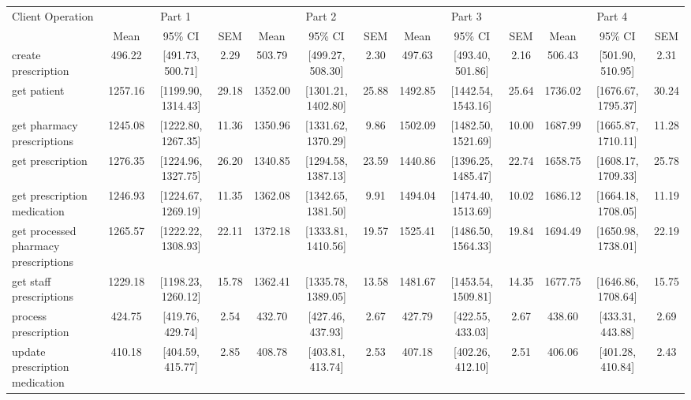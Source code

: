 \begin{tabular}{l|ccc|ccc|ccc|ccc}
\hline
Client Operation & \multicolumn{3}{c}{Part 1} & \multicolumn{3}{c}{Part 2} & \multicolumn{3}{c}{Part 3} & \multicolumn{3}{c}{Part 4} \\
  & Mean & 95\% CI & SEM & Mean & 95\% CI & SEM & Mean & 95\% CI & SEM & Mean & 95\% CI & SEM \\
\hline
 create prescription & 496.22 & [491.73, 500.71] & 2.29 & 503.79 & [499.27, 508.30] & 2.30 & 497.63 & [493.40, 501.86] & 2.16 & 506.43 & [501.90, 510.95] & 2.31 \\
 get patient & 1257.16 & [1199.90, 1314.43] & 29.18 & 1352.00 & [1301.21, 1402.80] & 25.88 & 1492.85 & [1442.54, 1543.16] & 25.64 & 1736.02 & [1676.67, 1795.37] & 30.24 \\
 get pharmacy prescriptions & 1245.08 & [1222.80, 1267.35] & 11.36 & 1350.96 & [1331.62, 1370.29] & 9.86 & 1502.09 & [1482.50, 1521.69] & 10.00 & 1687.99 & [1665.87, 1710.11] & 11.28 \\
 get prescription & 1276.35 & [1224.96, 1327.75] & 26.20 & 1340.85 & [1294.58, 1387.13] & 23.59 & 1440.86 & [1396.25, 1485.47] & 22.74 & 1658.75 & [1608.17, 1709.33] & 25.78 \\
 get prescription medication & 1246.93 & [1224.67, 1269.19] & 11.35 & 1362.08 & [1342.65, 1381.50] & 9.91 & 1494.04 & [1474.40, 1513.69] & 10.02 & 1686.12 & [1664.18, 1708.05] & 11.19 \\
 get processed pharmacy prescriptions & 1265.57 & [1222.22, 1308.93] & 22.11 & 1372.18 & [1333.81, 1410.56] & 19.57 & 1525.41 & [1486.50, 1564.33] & 19.84 & 1694.49 & [1650.98, 1738.01] & 22.19 \\
 get staff prescriptions & 1229.18 & [1198.23, 1260.12] & 15.78 & 1362.41 & [1335.78, 1389.05] & 13.58 & 1481.67 & [1453.54, 1509.81] & 14.35 & 1677.75 & [1646.86, 1708.64] & 15.75 \\
 process prescription & 424.75 & [419.76, 429.74] & 2.54 & 432.70 & [427.46, 437.93] & 2.67 & 427.79 & [422.55, 433.03] & 2.67 & 438.60 & [433.31, 443.88] & 2.69 \\
 update prescription medication & 410.18 & [404.59, 415.77] & 2.85 & 408.78 & [403.81, 413.74] & 2.53 & 407.18 & [402.26, 412.10] & 2.51 & 406.06 & [401.28, 410.84] & 2.43 \\
\hline
\end{tabular}